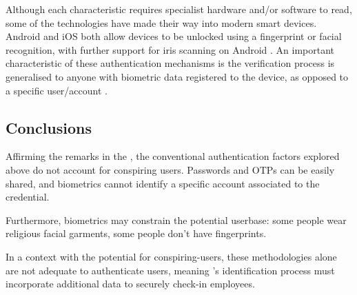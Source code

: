 Although each characteristic requires specialist hardware
and/or software to read, some of the technologies have made
their way into modern smart devices.
Android and iOS both allow devices to be unlocked using a
fingerprint or facial recognition, with further support for
iris scanning on Android \parencite{androidBiometrics,
  touchId, faceId}.
An important characteristic of these authentication
mechanisms is the verification process is generalised to
anyone with biometric data registered to the device, as
opposed to a specific user/account \parencite[][Return
  value of getAuthenticationType()]
{androidBiometricAuthResult}.

\subsection{Conclusions}

Affirming the remarks in the 
, the
conventional authentication factors explored above do not
account for conspiring users. Passwords and OTPs can be
easily shared, and biometrics cannot identify a specific 
account associated to the credential.

Furthermore, biometrics may constrain the potential
userbase: some people wear religious facial garments, some
people don't have fingerprints.

In a context with the potential for \gls{conspiring-users},
these methodologies alone are not adequate to authenticate
users, meaning \projectname's identification process 
must incorporate additional data to securely check-in 
employees.